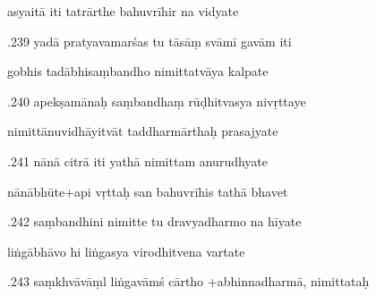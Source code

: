 \documentclass[article,12pt,a4paper]{memoir}%
\newcounter{parCount}
\begin{document}
	  
	  \pstart \leavevmode%
	asyaitā iti tatrārthe bahuvrīhir na vidyate 
	{}
	\pend%
      

	  
	  \pstart {}.239 yadā pratyavamarśas tu tāsāṃ svāmī gavām iti 
	{}
	\pend%
      

	  
	  \pstart \leavevmode%
	gobhis tadābhisaṃbandho nimittatvāya kalpate 
	{}
	\pend%
      

	  
	  \pstart {}.240 apekṣamānaḥ saṃbandhaṃ rūḍhitvasya nivṛttaye 
	{}
	\pend%
      

	  
	  \pstart \leavevmode%
	nimittānuvidhāyitvāt taddharmārthaḥ prasajyate 
	{}
	\pend%
      

	  
	  \pstart {}.241 nānā citrā iti yathā nimittam anurudhyate 
	{}
	\pend%
      

	  
	  \pstart \leavevmode%
	nānābhūte+api vṛttaḥ san bahuvrīhis tathā bhavet 
	{}
	\pend%
      

	  
	  \pstart {}.242 saṃbandhini nimitte tu dravyadharmo na hīyate 
	{}
	\pend%
      

	  
	  \pstart \leavevmode%
	liṅgābhāvo hi liṅgasya virodhitvena vartate 
	{}
	\pend%
      

	  
	  \pstart {}.243 saṃkhvāvāṃl liṅgavāmś cārtho   +abhinnadharmā, nimittataḥ 
	{}
	\pend%
      
\end{document}
